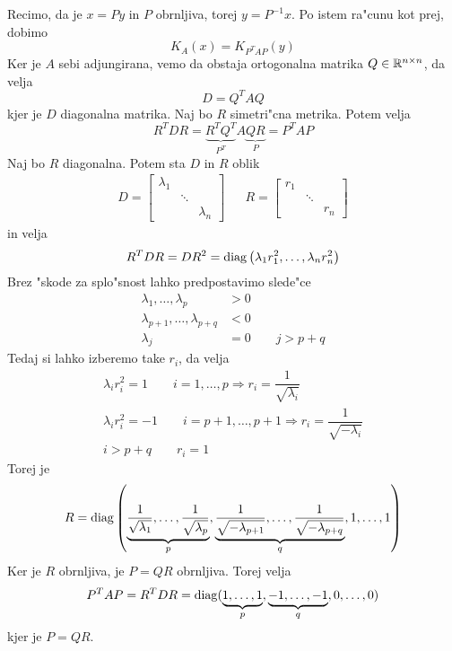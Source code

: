 Recimo, da je $x = Py$ in $P$ obrnljiva, torej $y = P^{-1} x$. Po istem ra"cunu kot prej, dobimo
\begin{equation*}
K_A(x) = K_{P^T AP}(y)
\end{equation*}
Ker je $A$ sebi adjungirana, vemo da obstaja ortogonalna matrika $Q \in \mathbb{R}^{n \times n}$, da velja
\begin{equation*}
D = Q^T A Q
\end{equation*}
kjer je $D$ diagonalna matrika. Naj bo $R$ simetri"cna metrika. Potem velja
\begin{equation*}
R^T D R = \underbrace{R^T Q^T}_{P^T} A \underbrace{QR}_P = P^T AP
\end{equation*}
Naj bo $R$ diagonalna. Potem sta $D$ in $R$ oblik
\begin{align*}
D = \begin{bmatrix}
\lambda_1 && \\
& \ddots & \\
&& \lambda_n
\end{bmatrix} &&
R = \begin{bmatrix}
r_1 && \\
& \ddots & \\
&& r_n
\end{bmatrix}
\end{align*}
in velja
\begin{equation*}
R^T DR = DR^2 = \operatorname{diag} \left( \lambda_1 r_1^2, \ldots, \lambda_n r_n^2 \right)
\end{equation*}
Brez "skode za splo"snost lahko predpostavimo slede"ce
\begin{align*}
\lambda_1, \ldots, \lambda_p &> 0 \\
\lambda_{p+1},  \ldots, \lambda_{p+q} &< 0 \\
\lambda_j &= 0 \qquad j > p + q
\end{align*}
Tedaj si lahko izberemo take $r_i$, da velja
\begin{gather*}
\lambda_i r_i^2 = 1 \qquad i = 1, \ldots, p \Rightarrow r_i = \dfrac{1}{\sqrt{\lambda_i}} \\
\lambda_i r_i^2 = -1 \qquad i = p+1, \ldots, p+1 \Rightarrow r_i = \dfrac{1}{\sqrt{-\lambda_i}} \\
i > p + q \qquad r_i = 1
\end{gather*}
Torej je
\begin{equation*}
R =\operatorname{diag} \left( \underbrace{\dfrac{1}{\sqrt{\lambda_1}}, \ldots, \dfrac{1}{\sqrt{\lambda_p}}}_p, \underbrace{\dfrac{1}{\sqrt{-\lambda_{p+1}}}, \ldots, \dfrac{1}{\sqrt{-\lambda_{p+q}}}}_q, 1, \ldots, 1 \right)
\end{equation*}
Ker je $R$ obrnljiva, je $P = QR$ obrnljiva. Torej velja
\begin{equation*}
P^T AP = R^T DR = \operatorname{diag} (\underbrace{1, \ldots, 1}_p, \underbrace{-1, \ldots, -1}_q, 0, \ldots, 0)
\end{equation*}
kjer je $P = QR$.

